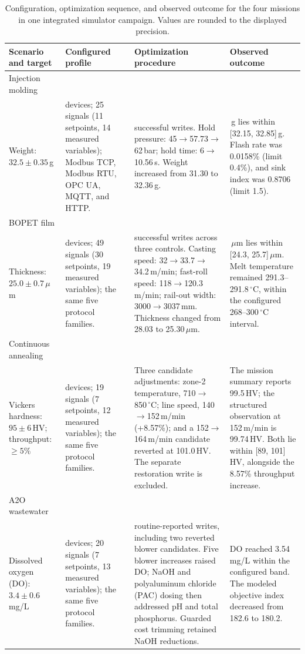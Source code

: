 \begin{table}[!t]
\centering
\caption{Configuration, optimization sequence, and observed outcome for the
four missions in one integrated simulator campaign. Values are rounded to the
displayed precision.}
\label{tab:scenario-results}
\footnotesize
\setlength{\tabcolsep}{4pt}
\begin{tabularx}{\textwidth}{@{}>{\raggedright\arraybackslash}p{1.7cm}>{\raggedright\arraybackslash}p{2.7cm}>{\raggedright\arraybackslash}X>{\raggedright\arraybackslash}X@{}}
\toprule
Scenario and target & Configured profile & Optimization procedure & Observed outcome \\
\midrule
Injection molding\\
Weight: $32.5\pm0.35$\,g &
5 devices; 25 signals (11 setpoints, 14 measured variables); Modbus TCP,
Modbus RTU, OPC UA, MQTT, and HTTP. &
3 successful writes. Hold pressure: 45$\rightarrow$57.73$\rightarrow$62\,bar;
hold time: 6$\rightarrow$10.56\,s. Weight increased from 31.30 to 32.36\,g. &
32.36\,g lies within [32.15, 32.85]\,g. Flash rate was 0.0158\%
(limit 0.4\%), and sink index was 0.8706 (limit 1.5). \\
\addlinespace
BOPET film\\
Thickness: $25.0\pm0.7$\,$\mu$m &
9 devices; 49 signals (30 setpoints, 19 measured variables); the same five
protocol families. &
4 successful writes across three controls. Casting speed:
32$\rightarrow$33.7$\rightarrow$34.2\,m/min; fast-roll speed:
118$\rightarrow$120.3\,m/min; rail-out width: 3000$\rightarrow$3037\,mm.
Thickness changed from 28.03 to
25.30\,$\mu$m. &
25.30\,$\mu$m lies within [24.3, 25.7]\,$\mu$m. Melt temperature remained
291.3--291.8\,$^\circ$C, within the configured 268--300\,$^\circ$C interval. \\
\addlinespace
Continuous annealing\\
Vickers hardness: $95\pm6$\,HV; throughput: $\geq5\%$ &
5 devices; 19 signals (7 setpoints, 12 measured variables); the same five
protocol families. &
Three candidate adjustments: zone-2 temperature, 710$\rightarrow$850\,$^\circ$C;
line speed, 140$\rightarrow$152\,m/min (+8.57\%); and a 152$\rightarrow$164\,m/min
candidate reverted at 101.0\,HV. The separate restoration write is excluded. &
The mission summary reports 99.5\,HV; the structured observation at
152\,m/min is 99.74\,HV. Both lie within [89, 101] HV, alongside the 8.57\%
throughput increase. \\
\addlinespace
A2O wastewater\\
Dissolved oxygen (DO): $3.4\pm0.6$\,mg/L &
5 devices; 20 signals (7 setpoints, 13 measured variables); the same five
protocol families. &
15 routine-reported writes, including two reverted blower candidates. Five
blower increases raised DO; NaOH and polyaluminum chloride (PAC) dosing then addressed pH and total
phosphorus. Guarded cost trimming retained NaOH reductions. &
DO reached 3.54\,mg/L within the configured band. The modeled objective index
decreased from 182.6 to 180.2. \\
\bottomrule
\end{tabularx}
\end{table}

